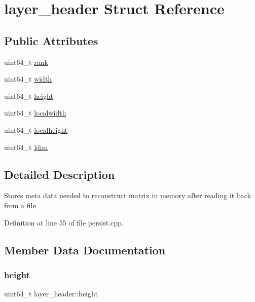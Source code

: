 \hypertarget{structlayer__header}{}\section{layer\+\_\+header Struct Reference}
\label{structlayer__header}
\subsection*{Public Attributes}
\begin{DoxyCompactItemize}
\item 
uint64\+\_\+t \hyperlink{structlayer__header_a325142c0466170c6627710106275c7fd}{rank}
\item 
uint64\+\_\+t \hyperlink{structlayer__header_af1f45c9c74db048ea424114418f22d50}{width}
\item 
uint64\+\_\+t \hyperlink{structlayer__header_ad986e4b92e5b455e066fd349725c6bd9}{height}
\item 
uint64\+\_\+t \hyperlink{structlayer__header_abb4a41358a68da8466879972fbcd034d}{localwidth}
\item 
uint64\+\_\+t \hyperlink{structlayer__header_a9ba1c0891787cf3b01611ef27e575a8b}{localheight}
\item 
uint64\+\_\+t \hyperlink{structlayer__header_a5b4ee2de6371d894b5646b74ceb5c321}{ldim}
\end{DoxyCompactItemize}


\subsection{Detailed Description}
Stores meta data needed to reconstruct matrix in memory after reading it back from a file 

Definition at line 55 of file persist.\+cpp.



\subsection{Member Data Documentation}
\mbox{\label{structlayer__header_ad986e4b92e5b455e066fd349725c6bd9}} 
\subsubsection{\texorpdfstring{height}{height}}
{\footnotesize\ttfamily uint64\+\_\+t layer\+\_\+header\+::height}

